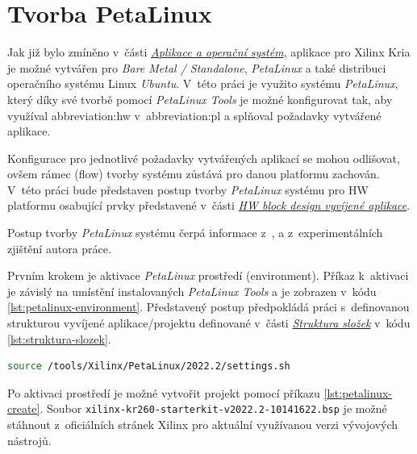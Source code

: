 \documentclass[a4paper, twoside, 11pt]{article}
\newcommand{\fbar}{\FloatBarrier}
\begin{document}

	\fbar
	\section{Tvorba PetaLinux}\label{subsec:tvorba-petalinux}
	Jak již bylo zmíněno v~části \hyperref[subsec:aplikace-a-operacni-system]{\textit{Aplikace a operační systém}}, aplikace pro Xilinx Kria je možné vytvářen pro \textit{Bare Metal / Standalone}, \textit{PetaLinux} a také distribuci operačního systému Linux \textit{Ubuntu}. V~této práci je využito systému \textit{PetaLinux}, který díky své tvorbě pomocí \textit{PetaLinux Tools} je možné konfigurovat tak, aby využíval \gls{abbreviation:hw} v~\gls{abbreviation:pl} a splňoval požadavky vytvářené aplikace.\par
	Konfigurace pro jednotlivé požadavky vytvářených aplikací se mohou odlišovat, ovšem rámec (flow) tvorby systému zůstává pro danou platformu zachován. V~této práci bude představen postup tvorby \textit{PetaLinux} systému pro HW platformu osabující prvky představené v~části \hyperref[subsubsec:hw-block-design-vyvijene-aplikace]{\textit{HW block design vyvíjené aplikace}}.\par
	Postup tvorby \textit{PetaLinux} systému čerpá informace z~\cite{hackster-getting-started-with-the-kria-kr260-in-petalinux}, \cite{xilinx-github-vitis-tutorials-step-2-create-the-software-components} a z~experimentálních zjištění autora práce.\par
	Prvním krokem je aktivace \textit{PetaLinux} prostředí (environment). Příkaz k~aktivaci je závislý na umístění instalovaných \textit{PetaLinux Tools} a je zobrazen v~kódu \ref{lst:petalinux-environment}. Představený postup předpokládá práci s~definovanou strukturou vyvíjené aplikace/projektu definované v~části \hyperref[sec:struktura-slozek]{\textit{Struktura složek}} v~kódu \ref{lst:struktura-slozek}.


	\begin{lstlisting}[language={sh}, caption={Aktivace prostředí PetaLinux verze 2022.2.}, label= {lst:petalinux-environment}, morekeywords={source}]
source /tools/Xilinx/PetaLinux/2022.2/settings.sh\end{lstlisting}

	Po aktivaci prostředí je možné vytvořit projekt pomocí příkazu \ref{lst:petalinux-create}. Soubor \texttt{xilinx-kr260-starterkit-v2022.2-10141622.bsp} je možné stáhnout z~oficiálních stránek Xilinx \cite{xilinx-downloads} pro aktuální využívanou verzi vývojových nástrojů.
\end{document}

